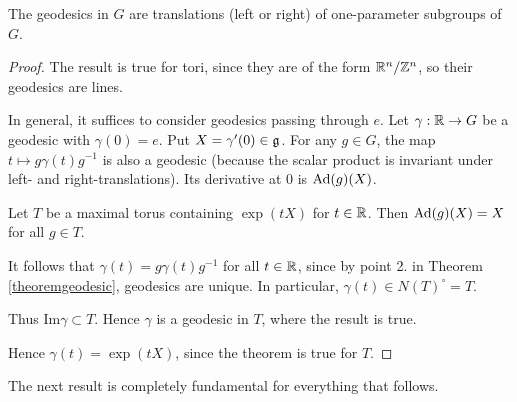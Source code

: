 \documentclass[11pt, english]{article}
\begin{document}
\begin{thm}
 The geodesics in $G$ are translations (left or right) of one-parameter subgroups of $G$.
\end{thm}

\begin{proof}

The result is true for tori, since they are of the form $\mathbb{R}^n/\mathbb{Z}^n$, so their geodesics are lines.

In general, it suffices to consider geodesics passing through $e$. Let $\gamma: \mathbb{R} \to G$ be a geodesic with $\gamma(0)=e$. Put $X= \gamma'(0) \in \mathfrak g$. For any $g \in G$, the map $t \mapsto g \gamma(t) g^{-1}$ is also a geodesic (because the scalar product is invariant under left- and right-translations). Its derivative at $0$ is $\operatorname{Ad}(g)(X)$.

Let $T$ be a maximal torus containing $\exp(tX)$ for $t \in \mathbb{R}$. Then $\operatorname{Ad}(g)(X)=X$ for all $g \in T$. 

It follows that $\gamma(t)=g \gamma(t) g^{-1}$ for all $t \in \mathbb{R}$, since by point 2. in Theorem \ref{theoremgeodesic}, geodesics are unique. In particular, $\gamma(t) \in N(T)^\circ =T $. 

Thus $\mathrm{Im} \gamma \subset T$. Hence $\gamma$ is a geodesic in $T$, where the result is true. 

Hence $\gamma(t) = \exp(tX)$, since the theorem is true for $T$.
\end{proof}

The next result is completely fundamental for everything that follows.
\end{document}
